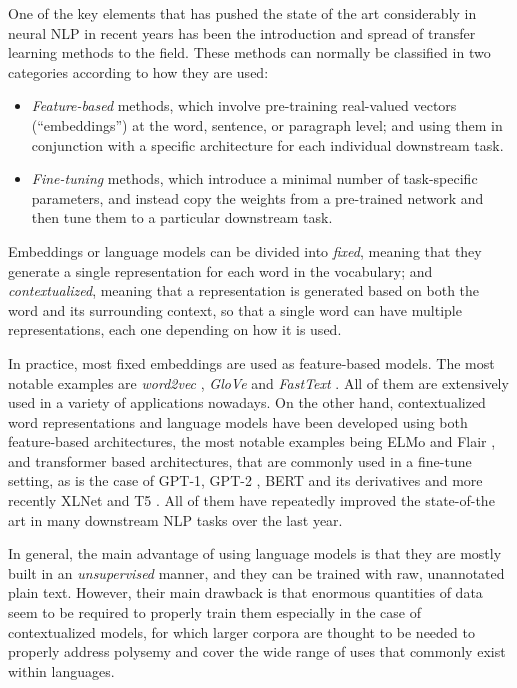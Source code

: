 One of the key elements that has pushed the state of the art considerably in neural NLP in recent years has been the introduction and spread of transfer learning methods to the field. These methods can normally be classified in two categories according to how they are used:
\begin{itemize}
    \item \emph{Feature-based} methods, which involve pre-training real-valued vectors (``embeddings'') at the word, sentence, or paragraph level; and using them in conjunction with a specific architecture for each individual downstream task.
    \item \emph{Fine-tuning} methods, which introduce a minimal number of task-specific parameters, and instead copy the weights from a pre-trained network and then tune them to a particular downstream task.
\end{itemize}
Embeddings or language models can be divided into \emph{fixed}, meaning that they generate a single representation for each word in the vocabulary; and \emph{contextualized}, meaning that a representation is generated based on both the word and its surrounding context, so that a single word can have multiple representations, each one depending on how it is used.

In practice, most fixed embeddings are used as feature-based models. The most notable examples are \emph{word2vec} \citep{mikolov-etal-2013-distributed}, \emph{GloVe} \citep{pennington-etal-2014-glove} and \emph{FastText} \citep{mikolov-etal-2018-advances}. All of them are extensively used in a variety of applications nowadays. On the other hand, contextualized word representations and language models have been developed using both feature-based architectures, the most notable examples being ELMo and Flair \citep{peters-etal-2018-deep,akbik-etal-2018-contextual}, and transformer based architectures, that are commonly used in a fine-tune setting, as is the case of GPT-1, GPT-2 \citep{radford-etal-2018-improving,radford-etal-2019-language}, BERT and its derivatives \citep{devlin-etal-2019-bert,liu-etal-2019-roberta,lan-etal-2020-albert} and more recently XLNet \citep{yang-etal-2019-xlnet} and T5 \citep{raffel-etal-2020-exploring}. All of them have repeatedly improved the state-of-the art in many downstream NLP tasks over the last year.

In general, the main advantage of using language models is that they are mostly built in an \emph{unsupervised} manner, and they can be trained with raw, unannotated plain text. However, their main drawback is that enormous quantities of data seem to be required to properly train them especially in the case of contextualized models, for which larger corpora are thought to be needed to properly address polysemy and cover the wide range of uses that commonly exist within languages.


